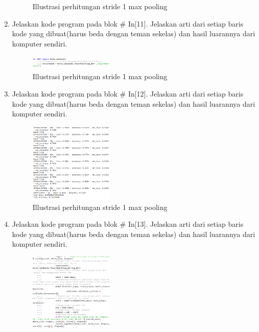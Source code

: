 \begin{enumerate}
\begin{figure}[H]
    \centering
    \caption{Illustrasi perhitungan stride 1 max pooling}
\end{figure}
\item Jelaskan kode program pada blok \# In[11]. Jelaskan arti dari setiap baris kode yang dibuat(harus beda dengan teman sekelas) dan hasil luarannya dari komputer sendiri.

\begin{figure}[H]
    \includegraphics[width=4cm]{figures/1174035/chapter7/praktek_11.png}
    \centering
    \caption{Illustrasi perhitungan stride 1 max pooling}
\end{figure}
\item Jelaskan kode program pada blok \# In[12]. Jelaskan arti dari setiap baris kode yang dibuat(harus beda dengan teman sekelas) dan hasil luarannya dari komputer sendiri.

\begin{figure}[H]
    \includegraphics[width=4cm]{figures/1174035/chapter7/Praktek_12.png}
    \centering
    \caption{Illustrasi perhitungan stride 1 max pooling}
\end{figure}
\item Jelaskan kode program pada blok \# In[13]. Jelaskan arti dari setiap baris kode yang dibuat(harus beda dengan teman sekelas) dan hasil luarannya dari komputer sendiri.

\begin{figure}[H]
    \includegraphics[width=4cm]{figures/1174035/chapter7/praktek_13.png}
    \centering

\end{figure}
\end{enumerate}
